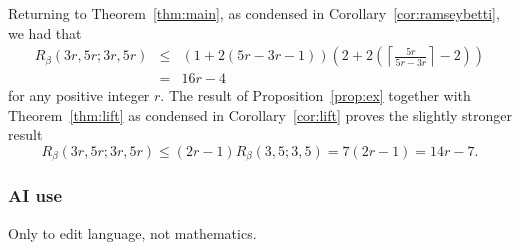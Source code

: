 \documentclass{article}
\theoremstyle{plain}
\theoremstyle{definition}
\begin{document}
Returning to Theorem~\ref{thm:main}, as condensed in Corollary~\ref{cor:ramseybetti}, we had that 
\[
\begin{array}{rcl}
R_\beta(3r,5r;3r,5r) & \leq & \left( 1+ 2(5r-3r-1) \right) \left(  2+ 2 \left( \left\lceil \frac{5r}{5r-3r} \right\rceil -2 \right)  \right) \\
& = & 16r-4
\end{array}
\]
for any positive integer $r.$ The result of Proposition~\ref{prop:ex} together with Theorem~\ref{thm:lift} as condensed in Corollary~\ref{cor:lift} proves the slightly stronger result
\[R_\beta (3r,5r;3r,5r)  \leq  (2r-1) R_\beta (3,5;3,5) = 7(2r-1) = 14r-7. \]

\subsubsection*{AI use} Only to edit language, not mathematics.
\end{document}
